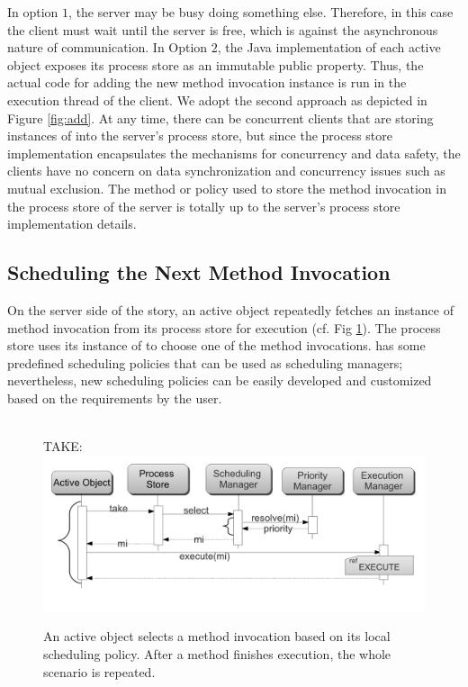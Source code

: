 In option $1$, the server may be busy doing something else. Therefore,
in this case the client must wait until the server is free,  which is
against the asynchronous nature of communication. In Option $2$, the
Java implementation of each active object exposes its process store as
an immutable public property. Thus, the actual code for adding the new
method invocation instance is run in the execution thread of the
client. 
We adopt the second approach as depicted in Figure \ref{fig:add}.
At any time, there can be concurrent clients that are
storing instances of  into the server's process store, but since
the process store implementation encapsulates the mechanisms for concurrency and
data safety, the clients have no concern on data synchronization and concurrency
issues such as mutual exclusion.
The method or policy used to store the method invocation in the process store of
the server is totally up to the server's process store implementation details.

\subsection{Scheduling the Next Method Invocation}

On the server side of the story,  an active object 
repeatedly fetches an instance of method invocation from its process
store for execution (cf. Fig \ref{fig:take}).
The process store uses its instance of
 to choose one of the method invocations. 
\Crisp has some predefined scheduling policies that can be used as scheduling managers;
nevertheless, new scheduling policies can be easily developed
and customized based on the requirements by the user. 

\begin{figure}[t]
~\\TAKE:\\
  \includegraphics[scale=0.3]{figs/seq-diag-2}
\vspace{-.7cm}
  \caption{An active object selects a method invocation based on its local scheduling policy. After a method finishes execution, the whole scenario is repeated.}
  \label{fig:take}
\end{figure}


